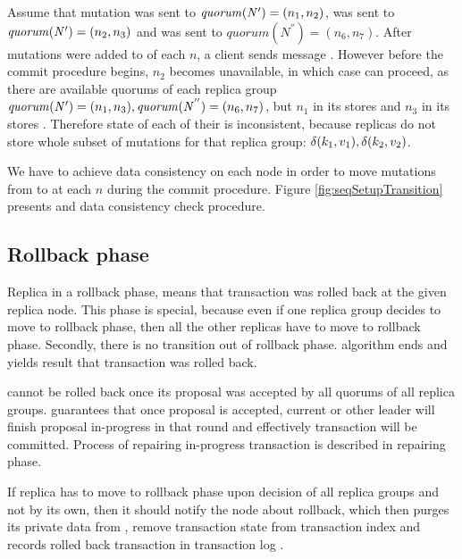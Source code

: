 Assume that mutation  was sent to $\mathit{quorum}(\text{$\mathit{N'}$})=(n_1, n_2)$,  was sent to $\mathit{quorum}(\text{$\mathit{N'}$})=(n_2, n_3)$ and
 was sent to $\mathit{quorum}(\mathit{N^{''}})=(n_6, n_7)$.
 After mutations were added to \txStorage of each $n$, a client \client sends message \txCommitMessage. However before the commit procedure begins, $n_2$ becomes unavailable, in which case  can proceed, as there are available quorums of each replica group 
 $\mathit{quorum}(\text{$\mathit{N'}$})=(n_1,n_3), \mathit{quorum}(\mathit{N^{''}})=(n_6,n_7)$, 
 but $n_1$ in its \txStorage stores  and $n_3$ in its \txStorage stores . Therefore state of each of their \txStorage is inconsistent, because replicas do not store whole subset of mutations for that replica group: $\text{$\delta(k_1, v_1)$}, \text{$\delta(k_2, v_2)$}$.

We have to achieve data consistency on each node in order to move mutations from \txStorage to \database at each $n$ during the commit procedure. Figure \ref{fig:seqSetupTransition} presents \setupTransition and data consistency check procedure.






\subsection{Rollback phase}
Replica in a rollback phase, means that transaction was rolled back at the given replica node. 
This phase is special, because even if one replica group decides to move to rollback phase, then all the other replicas have to move to rollback phase. Secondly, there is no transition out of rollback phase. \mpt algorithm ends and yields result that transaction was rolled back.

\transaction cannot be rolled back once its proposal was accepted by all quorums of all replica groups. \paxos guarantees that once proposal is accepted, current or other leader will finish proposal in-progress in that round and effectively transaction will be committed. Process of repairing in-progress transaction is described in repairing phase.

If replica has to move to rollback phase upon decision of all replica groups and not by its own, then it should notify the node about rollback, which then purges its private data from \txStorage, remove transaction state \txState from transaction index \txIndex and records rolled back transaction \transaction in transaction log \txLog.



